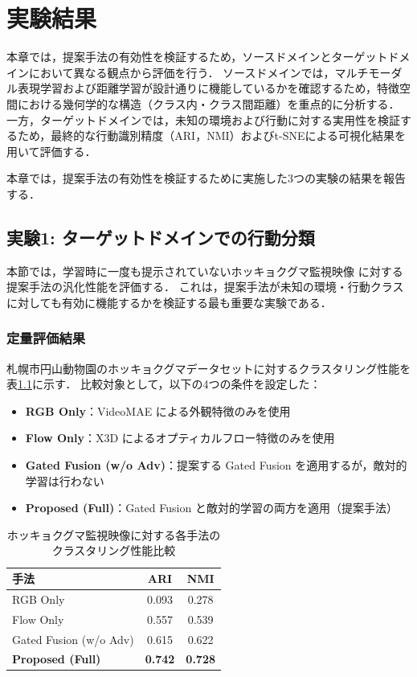 \chapter{実験結果}
\label{chap:results}

本章では，提案手法の有効性を検証するため，ソースドメインとターゲットドメインにおいて異なる観点から評価を行う．
ソースドメインでは，マルチモーダル表現学習および距離学習が設計通りに機能しているかを確認するため，特徴空間における幾何学的な構造（クラス内・クラス間距離）を重点的に分析する．
一方，ターゲットドメインでは，未知の環境および行動に対する実用性を検証するため，最終的な行動識別精度（ARI，NMI）およびt-SNEによる可視化結果を用いて評価する．

本章では，提案手法の有効性を検証するために実施した3つの実験の結果を報告する．

\section{実験1: ターゲットドメインでの行動分類}
本節では，学習時に一度も提示されていないホッキョクグマ監視映像
に対する提案手法の汎化性能を評価する．
これは，提案手法が未知の環境・行動クラスに対しても有効に機能するかを検証する最も重要な実験である．

\subsection{定量評価結果}
札幌市円山動物園のホッキョクグマデータセットに対するクラスタリング性能を
表\ref{tab:clustering_results_polar}に示す．
比較対象として，以下の4つの条件を設定した：

\begin{itemize}
  \item \textbf{RGB Only}：VideoMAE による外観特徴のみを使用
  \item \textbf{Flow Only}：X3D によるオプティカルフロー特徴のみを使用
  \item \textbf{Gated Fusion (w/o Adv)}：提案する Gated Fusion を適用するが，敵対的学習は行わない
  \item \textbf{Proposed (Full)}：Gated Fusion と敵対的学習の両方を適用（提案手法）
\end{itemize}

\begin{table}[t]
  \centering
  \caption{ホッキョクグマ監視映像に対する各手法のクラスタリング性能比較}
  \label{tab:clustering_results_polar}
  \begin{tabular}{lcc}
    \hline
    手法 & ARI & NMI \\
    \hline \hline
    RGB Only & 0.093 & 0.278 \\
    Flow Only & 0.557 & 0.539 \\
    Gated Fusion (w/o Adv) & 0.615 & 0.622 \\
    \textbf{Proposed (Full)} & \textbf{0.742} & \textbf{0.728} \\
    \hline
  \end{tabular}
\end{table}

